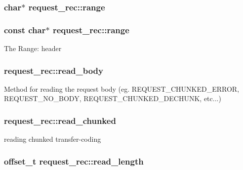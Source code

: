 \subsubsection[{\texorpdfstring{range}{range}}]{\setlength{\rightskip}{0pt plus 5cm}char$\ast$ request\+\_\+rec\+::range}\hypertarget{structrequest__rec_ab1bcc4965124331f6362be8be7920d54}{}\label{structrequest__rec_ab1bcc4965124331f6362be8be7920d54}
\subsubsection[{\texorpdfstring{range}{range}}]{\setlength{\rightskip}{0pt plus 5cm}const char$\ast$ request\+\_\+rec\+::range}\hypertarget{structrequest__rec_acb9feed7beb883807be44ee3011ebdf3}{}\label{structrequest__rec_acb9feed7beb883807be44ee3011ebdf3}
The Range\+: header 
\subsubsection[{\texorpdfstring{read\+\_\+body}{read_body}}]{ request\+\_\+rec\+::read\+\_\+body}\hypertarget{structrequest__rec_a3e497fa2bdce1f63d6a4e896e8a0687e}{}\label{structrequest__rec_a3e497fa2bdce1f63d6a4e896e8a0687e}
Method for reading the request body (eg. R\+E\+Q\+U\+E\+S\+T\+\_\+\+C\+H\+U\+N\+K\+E\+D\+\_\+\+E\+R\+R\+OR, R\+E\+Q\+U\+E\+S\+T\+\_\+\+N\+O\+\_\+\+B\+O\+DY, R\+E\+Q\+U\+E\+S\+T\+\_\+\+C\+H\+U\+N\+K\+E\+D\+\_\+\+D\+E\+C\+H\+U\+NK, etc...) 
\subsubsection[{\texorpdfstring{read\+\_\+chunked}{read_chunked}}]{ request\+\_\+rec\+::read\+\_\+chunked}\hypertarget{structrequest__rec_acd29d29a1757e70bdddf64ee8eaed963}{}\label{structrequest__rec_acd29d29a1757e70bdddf64ee8eaed963}
reading chunked transfer-\/coding 
\subsubsection[{\texorpdfstring{read\+\_\+length}{read_length}}]{\setlength{\rightskip}{0pt plus 5cm}offset\+\_\+t request\+\_\+rec\+::read\+\_\+length}\hypertarget{structrequest__rec_a50f96bf2cf5fd8377ead4c3f89c03eb7}{}\label{structrequest__rec_a50f96bf2cf5fd8377ead4c3f89c03eb7}
